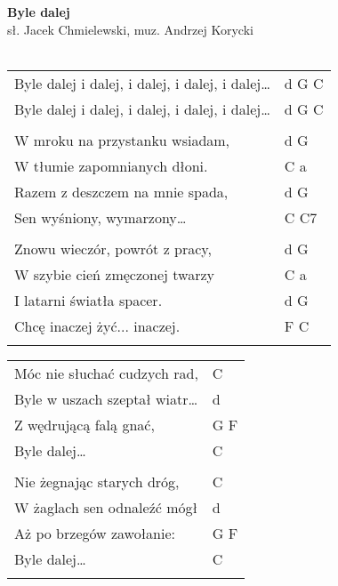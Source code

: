 \documentclass[a5paper]{article}
\begin{document}


\noindent
\fontsize{12pt}{15pt}\selectfont
\textbf{Byle dalej} \\
\fontsize{8pt}{10pt}\selectfont
sł. Jacek Chmielewski, muz. Andrzej Korycki \\ \\
\fontsize{10pt}{12pt}\selectfont
{}
\begin{tabular}{@{}p{8.5cm}p{3cm}@{}}
\noindent
Byle dalej i dalej, i dalej, i dalej, i dalej…  &d G C \\
Byle dalej i dalej, i dalej, i dalej, i dalej…  &d G C \\ \\

W mroku na przystanku wsiadam, & d G \\
W tłumie zapomnianych dłoni. & C a \\
Razem z deszczem na mnie spada, & d G \\
Sen wyśniony, wymarzony… & C C7 \\ \\

Znowu wieczór, powrót z pracy, & d G \\
W szybie cień zmęczonej twarzy & C a \\
I latarni światła spacer. & d G \\
Chcę inaczej żyć... inaczej. & F C \\\\
\end{tabular}

\noindent
\begin{tabular}{@{}p{7.5cm}p{3cm}@{}}
Móc nie słuchać cudzych rad, & C \\
Byle w uszach szeptał wiatr… & d \\
Z wędrującą falą gnać, & G F \\
Byle dalej… & C \\\\

Nie żegnając starych dróg, & C \\
W żaglach sen odnaleźć mógł & d \\
Aż po brzegów zawołanie: & G F \\
Byle dalej… & C \\\\
\end{tabular}
\end{document}
